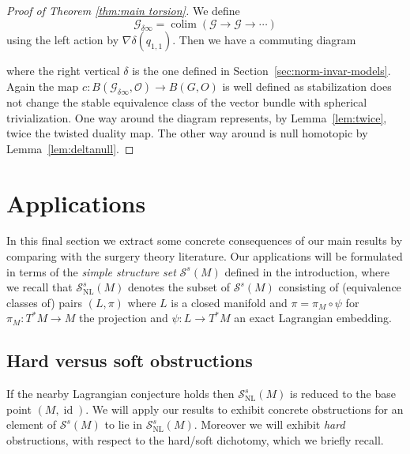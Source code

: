 \documentclass[reqno]{amsart}
\theoremstyle{theorem}
\theoremstyle{remark}
\theoremstyle{definition}
\DeclareMathOperator*{\colim}{colim}
\newcommand{\NL}{\mathrm{NL}}
\newcommand{\TT}{\widetilde{\mathcal{T}}}
\newcommand{\GG}{\mathcal{G}}
\newcommand{\QQ}{\mathcal{Q}}
\newcommand{\OO}{\mathcal{O}}
\renewcommand{\SS}{\mathcal{S}}
\newcommand{\TOP}{\mathrm{Top}}
\DeclareMathOperator{\id}{id}
\begin{document}
\begin{proof}[Proof of Theorem \ref{thm:main torsion}]
  We define
  $$\GG_{\delta \infty} = \colim \left( \GG \to \GG \to \cdots \right) $$
  using the left action by $\nabla \delta(q_{1,1})$. Then we have a commuting diagram
  \begin{center}
  \end{center}
  where the right vertical $\delta$ is the one defined in Section~\ref{sec:norm-invar-models}. Again the map $c: B(\GG_{\delta \infty} ,\OO) \to B(G,O)$ is well defined as stabilization does not change the stable equivalence class of the vector bundle with spherical trivialization. One way around the diagram represents, by Lemma~\ref{lem:twice}, twice the twisted duality map. The other way around is null homotopic by Lemma~\ref{lem:deltanull}.
\end{proof} 


\section{Applications}\label{sec:appli}


In this final section we extract some concrete consequences of our main results by comparing with the surgery theory literature. Our applications will be formulated in terms of the
\emph{simple structure set} $\SS^s(M)$ defined in the introduction, where we recall that $\SS^s_\NL(M)$ denotes the subset of $\SS^s(M)$ consisting of (equivalence classes of) pairs $(L,\pi)$
where $L$ is a closed manifold and $\pi=\pi_M\circ \psi$ for $\pi_M\colon T^*M \to M$ the
projection and $\psi\colon L \to T^*M$ an exact Lagrangian embedding.


\subsection{Hard versus soft obstructions}\label{sec: hard/soft}



If the nearby Lagrangian conjecture holds then $\SS^s_\NL(M)$ is reduced to the base point $(M,\id)$. We will apply our results to exhibit concrete obstructions for an element of $\SS^s(M)$ to lie in $\SS^s_\NL(M)$. Moreover we will exhibit {\em hard} obstructions, with respect to the hard/soft dichotomy, which we briefly recall.
\end{document}
